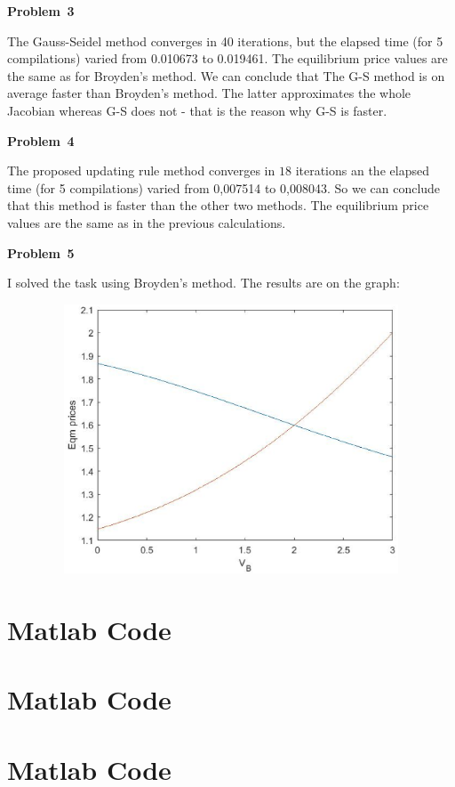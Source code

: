 \documentclass[a4paper,12pt]{article}
\begin{document}
\textbf{Problem \textnumero \,3 }

\vspace{\baselineskip}
The Gauss-Seidel method converges in 40 iterations, but the elapsed time (for 5 compilations) varied from 0.010673 to 0.019461. The equilibrium price values are the same as for Broyden's method. We can conclude that The G-S method is on average faster than Broyden's method. The latter approximates the whole Jacobian whereas G-S does not - that is the reason why G-S is faster.
\vspace{\baselineskip}

\textbf{Problem \textnumero \,4 }

\vspace{\baselineskip}
The proposed updating rule method converges in $18$ iterations an the elapsed time (for 5 compilations) varied from 0,007514 to 0,008043. So we can conclude that this method is faster than the other two methods. The equilibrium price values are the same as in the previous calculations.
\vspace{\baselineskip}

\textbf{Problem \textnumero \,5 }

\vspace{\baselineskip}
I solved the task using Broyden's method. The results are on the graph:

\begin{figure}[h]
\centering
\includegraphics[width=16cm,height=8cm,keepaspectratio]{Equilibrium.eps}
\end{figure}
\vspace{\baselineskip}

\newpage
\section*{Matlab Code} 
\newpage
\section*{Matlab Code} 
\newpage
\section*{Matlab Code} 
\end{document}
